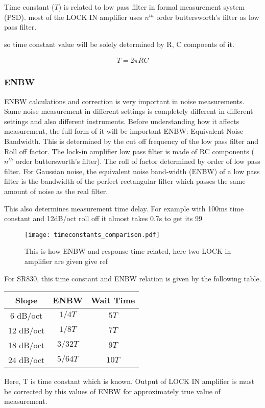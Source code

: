 Time constant ($T$) is related to low pass filter in formal measurement system (PSD). most of the LOCK IN amplifier uses $n^{th}$ order buttersworth's filter as low pass filter.

so time constant value will be solely determined by R, C compoents of it.

\begin{align*}
T = 2 \pi R C
\end{align*}

\subsubsection{ENBW}

ENBW calculations and correction is very important in noise measurements. Same noise measurement in different settings is completely different in different settings and also different instruments. Before understanding how it affects measurement, the full form of it will be important ENBW: Equivalent Noise Bandwidth. This is determined by the cut off frequency of the low pass filter and  Roll off factor. The lock-in amplifier low pass filter is made of RC components ($n^{th}$ order buttersworth’s filter).  The roll of factor determined by order of low pass filter.  For Gaussian noise, the equivalent noise band-width (ENBW) of a low pass filter is the bandwidth of the perfect rectangular filter which passes the same amount of noise as the real filter.

This also determines measurement time delay. For example with 100ms time constant and 12dB/oct roll off it almost takes 0.7s to get its 99%

\begin{figure}[hbt!]
  \centering\texttt{[image: timeconstants\_comparison.pdf]}
\caption{This is how ENBW and response time related, here two LOCK in amplifier are given give ref}
  
\end{figure}


For SR830, this time constant and ENBW relation is given by the following table. 
\begin{center}
\begin{tabular}{| c | c | c |}
\hline
Slope & ENBW & Wait Time\\
\hline
6 dB/oct & $1/4T$ & $5T$ \\
12 dB/oct & $1/8T$ & $7T$ \\
18 dB/oct & $3/32T$ & $9T$ \\
24 dB/oct & $5/64T$ & $10T$\\
\hline
\end{tabular}
\end{center}
Here, T is time constant which is known. Output of LOCK IN amplifier is must be corrected by this values of ENBW for approximately true value of measurement.

